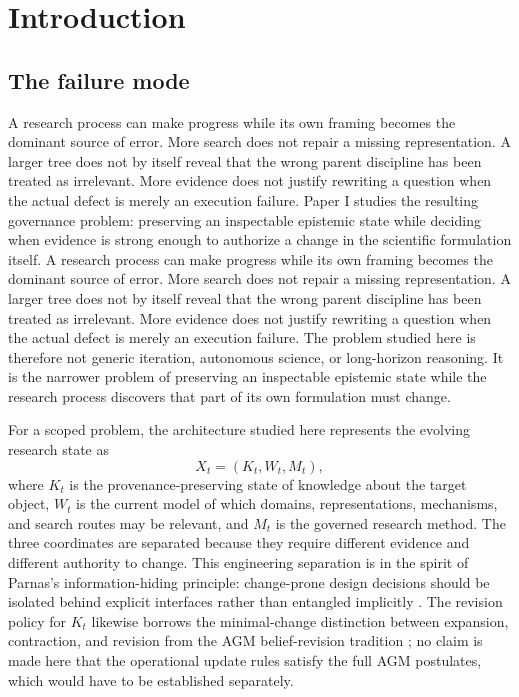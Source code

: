 \section{Introduction}

\subsection{The failure mode}

A research process can make progress while its own framing becomes the dominant source of error. More search does not repair a missing representation. A larger tree does not by itself reveal that the wrong parent discipline has been treated as irrelevant. More evidence does not justify rewriting a question when the actual defect is merely an execution failure. Paper I studies the resulting governance problem: preserving an inspectable epistemic state while deciding when evidence is strong enough to authorize a change in the scientific formulation itself.
A research process can make progress while its own framing becomes the dominant source of error. More search does not repair a missing representation. A larger tree does not by itself reveal that the wrong parent discipline has been treated as irrelevant. More evidence does not justify rewriting a question when the actual defect is merely an execution failure. The problem studied here is therefore not generic iteration, autonomous science, or long-horizon reasoning. It is the narrower problem of preserving an inspectable epistemic state while the research process discovers that part of its own formulation must change.

For a scoped problem, the architecture studied here represents the evolving research state as
\[
X_t=(K_t,W_t,M_t),
\]
where $K_t$ is the provenance-preserving state of knowledge about the target object, $W_t$ is the current model of which domains, representations, mechanisms, and search routes may be relevant, and $M_t$ is the governed research method. The three coordinates are separated because they require different evidence and different authority to change. This engineering separation is in the spirit of Parnas's information-hiding principle: change-prone design decisions should be isolated behind explicit interfaces rather than entangled implicitly \cite{parnas1972}. The revision policy for $K_t$ likewise borrows the minimal-change distinction between expansion, contraction, and revision from the AGM belief-revision tradition \cite{agm1985}; no claim is made here that the operational update rules satisfy the full AGM postulates, which would have to be established separately.

